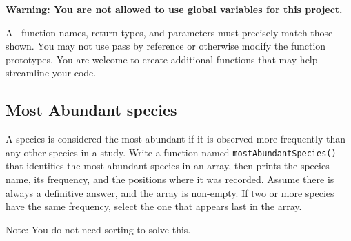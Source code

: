 \textbf{Warning: You are not allowed to use global variables for this project.}

All function names, return types, and parameters must precisely match those shown. You may not use pass by reference or otherwise modify the function prototypes. You are welcome to create additional functions that may help streamline your code. 

\subsection{Most Abundant species}

A species is considered the most abundant if it is observed more frequently than any other species in a study. Write a function named \texttt{mostAbundantSpecies()} that identifies the most abundant species in an array, then prints the species name, its frequency, and the positions where it was recorded. Assume there is always a definitive answer, and the array is non-empty. If two or more species have the same frequency, select the one that appears last in the array.

Note: You do not need sorting to solve this.




